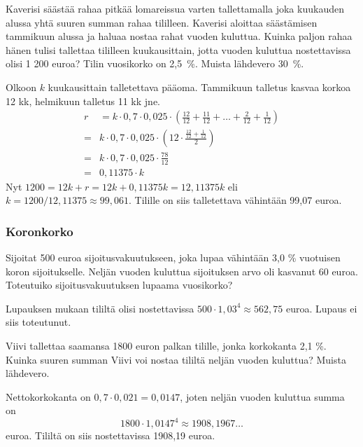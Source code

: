 \documentclass[a4paper,10pt]{article}\usepackage[]{graphicx}\usepackage[]{color}
\begin{document}
\begin{question} Kaverisi säästää rahaa pitkää lomareissua varten tallettamalla joka kuukauden alussa yhtä suuren summan rahaa tililleen.
Kaverisi aloittaa säästämisen tammikuun alussa ja haluaa nostaa rahat vuoden kuluttua.
Kuinka paljon rahaa hänen tulisi tallettaa tililleen kuukausittain, jotta vuoden kuluttua nostettavissa olisi 1 200 euroa? Tilin vuosikorko on 2{,}5~\%. Muista lähdevero 30~\%.
\end{question}\begin{solution}
    Olkoon \(k\) kuukausittain talletettava pääoma. Tammikuun talletus kasvaa korkoa 12 kk, helmikuun talletus 11 kk jne.
    \begin{align*}
        r &= k\cdot0,7\cdot0,025\cdot\left(\frac{12}{12} + \frac{11}{12} + \ldots + \frac{2}{12} + \frac{1}{12}\right)\\
         =& k\cdot0,7\cdot0,025\cdot\left(12\cdot\frac{\frac{12}{12} + \frac{1}{12}}{2}\right)\\
         =& k\cdot0,7\cdot0,025\cdot\frac{78}{12}\\
         =& 0,11375\cdot k
    \end{align*}
    Nyt \(1200 = 12k + r = 12k + 0,11375k = 12{,}11375k\) eli \(k = 1200/12{,}11375\approx 99,061\).
    Tilille on siis talletettava vähintään 99,07 euroa.
\end{solution}

\subsubsection*{Koronkorko}

\begin{question} Sijoitat 500 euroa sijoitusvakuutukseen, joka lupaa vähintään 3{,}0 \% vuotuisen koron sijoitukselle.
Neljän vuoden kuluttua sijoituksen arvo oli kasvanut 60 euroa. Toteutuiko sijoitusvakuutuksen lupaama vuosikorko?
\end{question}\begin{solution}
    Lupauksen mukaan tililtä olisi nostettavissa \(500\cdot1,03^4\approx562,75\) euroa. Lupaus ei siis toteutunut.
\end{solution}

\begin{question} Viivi tallettaa saamansa 1800 euron palkan tilille, jonka korkokanta 2,1 \%. Kuinka suuren summan Viivi voi nostaa tililtä
neljän vuoden kuluttua? Muista lähdevero.
\end{question}\begin{solution}
    Nettokorkokanta on \(0,7\cdot0,021 = 0,0147\),
    joten neljän vuoden kuluttua summa on
    \[
        1800\cdot1,0147^4\approx1908,1967\dots
    \]
    euroa. Tililtä on siis nostettavissa 1908,19 euroa.
\end{solution}
\end{document}
